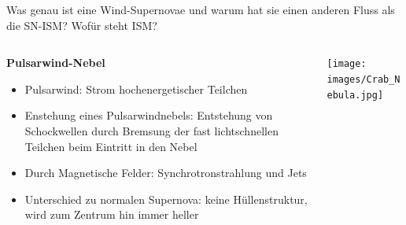 \begin{frame}{Was genau ist eine Wind-Supernovae und warum hat sie einen anderen Fluss als die SN-ISM? Wofür steht ISM?}
  \begin{columns}
    \begin{column}{0.5\textwidth}
      \textbf{Pulsarwind-Nebel}
      \begin{itemize}
        \item Pulsarwind: Strom hochenergetischer Teilchen
        \item Enstehung eines Pulsarwindnebels: Entstehung von Schockwellen durch Bremsung der fast lichtschnellen Teilchen beim Eintritt in den Nebel
        \item Durch Magnetische Felder: Synchrotronstrahlung und Jets
        \item Unterschied zu normalen Supernova: keine Hüllenstruktur, wird zum Zentrum hin immer heller
        \end{itemize}
    \end{column}
    \begin{column}{0.5\textwidth}
        \texttt{[image: images/Crab\_Nebula.jpg]}
      \end{column}
  \end{columns}
\end{frame}

